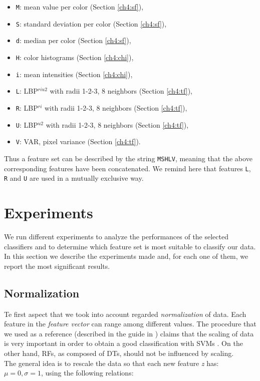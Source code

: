 \begin{itemize}
 \item \texttt{M}: mean value per color (Section \ref{ch4:sf}),
 \item \texttt{S}: standard deviation per color (Section \ref{ch4:sf}),
 \item \texttt{d}: median per color (Section \ref{ch4:sf}),
 \item \texttt{H}: color histograms (Section \ref{ch4:chi}),
 \item \texttt{i}: mean intensities (Section \ref{ch4:chi}),
 \item \texttt{L}: LBP$^{riu2}$ with radii 1-2-3, 8 neighbors (Section \ref{ch4:tf}),
 \item \texttt{R}: LBP$^{ri}$ with radii 1-2-3, 8 neighbors (Section \ref{ch4:tf}),
 \item \texttt{U}: LBP$^{u2}$ with radii 1-2-3, 8 neighbors (Section \ref{ch4:tf}),
 \item \texttt{V}: VAR, pixel variance (Section \ref{ch4:tf}).
\end{itemize}

\noindent Thus a feature set can be described by the string \texttt{MSHLV}, meaning that the above corresponding features have been concatenated.
We remind here that features \texttt{L}, \texttt{R} and \texttt{U} are used in a mutually exclusive way. 

\vspace{0.5cm}

\section{Experiments}


We run different experiments to analyze the performances of the selected classifiers and to determine which feature set is most suitable to classify our data.
In this section we describe the experiments made and, for each one of them, we report the most significant results.

\vspace{0.5cm}

\subsection{Normalization}

Te first aspect that we took into account regarded \textit{normalization} of data. Each feature in the \textit{feature vector} can range among different values.
The procedure that we used as a reference (described in the guide in \cite{SVM01}) claims that the scaling of data is very important in order to obtain a good classification with \Glspl{SVM} \cite{juszczak2002feature}.
On the other hand, \Glspl{RF}, as composed of \Glspl{DT}, should not be influenced by scaling.\\
The general idea is to rescale the data so that each new feature \textit{z} has: $\mu = 0, \sigma = 1$, using the following relations:

